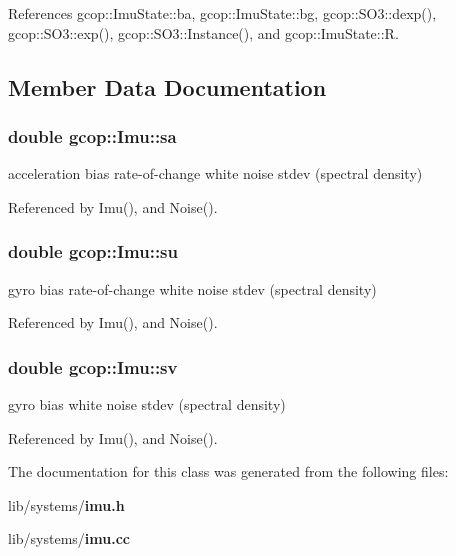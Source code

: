\-References gcop\-::\-Imu\-State\-::ba, gcop\-::\-Imu\-State\-::bg, gcop\-::\-S\-O3\-::dexp(), gcop\-::\-S\-O3\-::exp(), gcop\-::\-S\-O3\-::\-Instance(), and gcop\-::\-Imu\-State\-::\-R.



\subsection{\-Member \-Data \-Documentation}
\subsubsection[{sa}]{\setlength{\rightskip}{0pt plus 5cm}double {\bf gcop\-::\-Imu\-::sa}}\label{classgcop_1_1Imu_ae11beca1cb664e4164fc3b66365672b5}


acceleration bias rate-\/of-\/change white noise stdev (spectral density) 



\-Referenced by \-Imu(), and \-Noise().

\subsubsection[{su}]{\setlength{\rightskip}{0pt plus 5cm}double {\bf gcop\-::\-Imu\-::su}}\label{classgcop_1_1Imu_ae57e3304cbdaecdbbfcf225a3a46996d}


gyro bias rate-\/of-\/change white noise stdev (spectral density) 



\-Referenced by \-Imu(), and \-Noise().

\subsubsection[{sv}]{\setlength{\rightskip}{0pt plus 5cm}double {\bf gcop\-::\-Imu\-::sv}}\label{classgcop_1_1Imu_ad776bf1de79f4396893f26d3efe57d86}


gyro bias white noise stdev (spectral density) 



\-Referenced by \-Imu(), and \-Noise().



\-The documentation for this class was generated from the following files\-:\begin{DoxyCompactItemize}
\item 
lib/systems/{\bf imu.\-h}\item 
lib/systems/{\bf imu.\-cc}\end{DoxyCompactItemize}
